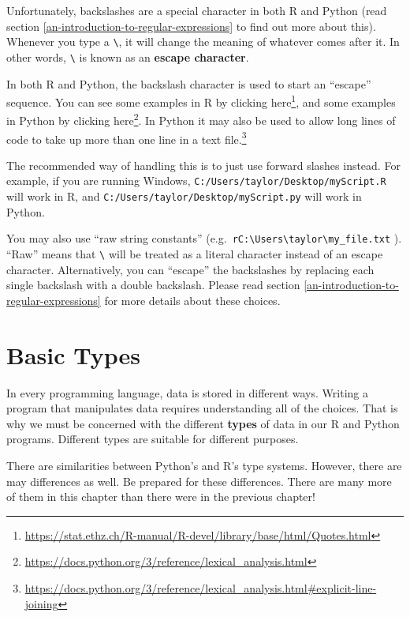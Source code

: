 \documentclass[
  12pt,
  krantz2]{krantz}
\renewcommand{\href}[2]{#2\footnote{\url{#1}}}
\begin{document}
Unfortunately, backslashes are a special character in both R and Python (read section \ref{an-introduction-to-regular-expressions} to find out more about this). Whenever you type a \texttt{\textbackslash{}}, it will change the meaning of whatever comes after it. In other words, \texttt{\textbackslash{}} is known as an \textbf{escape character}.

In both R and Python, the backslash character is used to start an ``escape'' sequence. You can see some examples in R by clicking \href{https://stat.ethz.ch/R-manual/R-devel/library/base/html/Quotes.html}{here}, and some examples in Python by clicking \href{https://docs.python.org/3/reference/lexical_analysis.html}{here}. In Python it may also be used to \href{https://docs.python.org/3/reference/lexical_analysis.html\#explicit-line-joining}{allow long lines of code to take up more than one line in a text file.}

The recommended way of handling this is to just use forward slashes instead. For example, if you are running Windows, \texttt{C:/Users/taylor/Desktop/myScript.R} will work in R, and \texttt{C:/Users/taylor/Desktop/myScript.py} will work in Python.

You may also use ``raw string constants'' (e.g.~\texttt{r\textquotesingle{}C:\textbackslash{}Users\textbackslash{}taylor\textbackslash{}my\_file.txt\textquotesingle{}} ). ``Raw'' means that \texttt{\textbackslash{}} will be treated as a literal character instead of an escape character. Alternatively, you can ``escape'' the backslashes by replacing each single backslash with a double backslash. Please read section \ref{an-introduction-to-regular-expressions} for more details about these choices.

\hypertarget{basic-types}{%
\chapter{Basic Types}\label{basic-types}}

In every programming language, data is stored in different ways. Writing a program that manipulates data requires understanding all of the choices. That is why we must be concerned with the different \textbf{types} of data in our R and Python programs. Different types are suitable for different purposes.

There are similarities between Python's and R's type systems. However, there are may differences as well. Be prepared for these differences. There are many more of them in this chapter than there were in the previous chapter!
\end{document}
